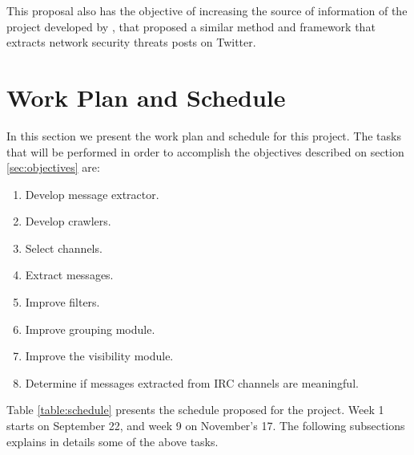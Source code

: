 \documentclass[12pt]{article}
\begin{document}
This proposal also has the objective of increasing the source of information
of the project developed by \cite{campiolo2013}, that proposed a similar method
and framework that extracts network security threats posts on Twitter.

\section{Work Plan and Schedule} \label{sec:workplan}

In this section we present the work plan and schedule for this project. The
tasks that will be performed in order to accomplish the objectives described on
section \ref{sec:objectives} are:

\begin{enumerate}
    \item{Develop message extractor.}
    \item{Develop crawlers.}
    \item{Select channels.}
    \item{Extract messages.}
    \item{Improve filters.}
    \item{Improve grouping module.}
    \item{Improve the visibility module.}
    \item{Determine if messages extracted from IRC channels are meaningful.}
\end{enumerate}

Table \ref{table:schedule} presents the schedule proposed for the project. Week
1 starts on September 22, and week 9 on November's 17. The
following subsections explains in details some of the above tasks.
\end{document}
